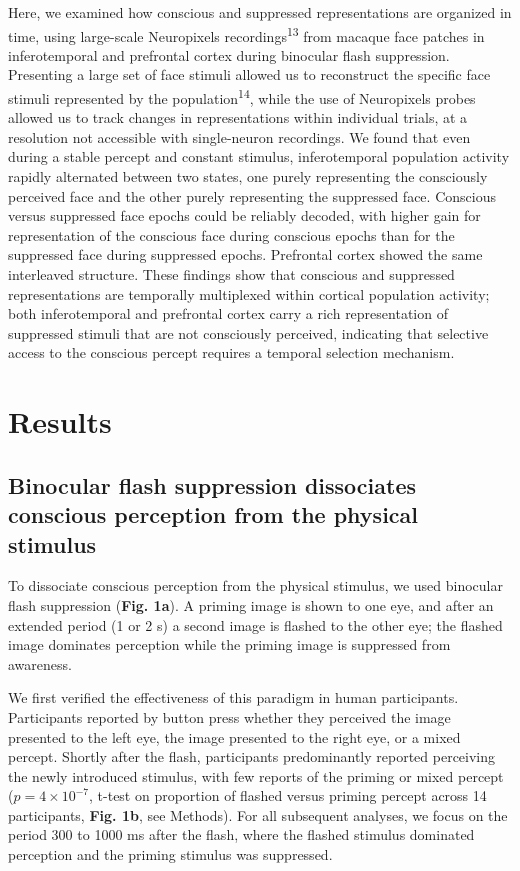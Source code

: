 \documentclass{article}
\begin{document}
Here, we examined how conscious and suppressed representations are organized in time, using large-scale Neuropixels recordings\textsuperscript{13} from macaque face patches in inferotemporal and prefrontal cortex during binocular flash suppression. Presenting a large set of face stimuli allowed us to reconstruct the specific face stimuli represented by the population\textsuperscript{14}, while the use of Neuropixels probes allowed us to track changes in representations within individual trials, at a resolution not accessible with single-neuron recordings. We found that even during a stable percept and constant stimulus, inferotemporal population activity rapidly alternated between two states, one purely representing the consciously perceived face and the other purely representing the suppressed face. Conscious versus suppressed face epochs could be reliably decoded, with higher gain for representation of the conscious face during conscious epochs than for the suppressed face during suppressed epochs. Prefrontal cortex showed the same interleaved structure. These findings show that conscious and suppressed representations are temporally multiplexed within cortical population activity; both inferotemporal and prefrontal cortex carry a rich representation of suppressed stimuli that are not consciously perceived, indicating that selective access to the conscious percept requires a temporal selection mechanism.

\section*{Results}

\subsection*{Binocular flash suppression dissociates conscious perception from the physical stimulus}

To dissociate conscious perception from the physical stimulus, we used binocular flash suppression (\textbf{Fig. 1a}). A priming image is shown to one eye, and after an extended period (1 or 2 s) a second image is flashed to the other eye; the flashed image dominates perception while the priming image is suppressed from awareness.

We first verified the effectiveness of this paradigm in human participants. Participants reported by button press whether they perceived the image presented to the left eye, the image presented to the right eye, or a mixed percept. Shortly after the flash, participants predominantly reported perceiving the newly introduced stimulus, with few reports of the priming or mixed percept ($p = 4 \times 10^{-7}$, t-test on proportion of flashed versus priming percept across 14 participants, \textbf{Fig. 1b}, see Methods). For all subsequent analyses, we focus on the period 300 to 1000 ms after the flash, where the flashed stimulus dominated perception and the priming stimulus was suppressed.
\end{document}

